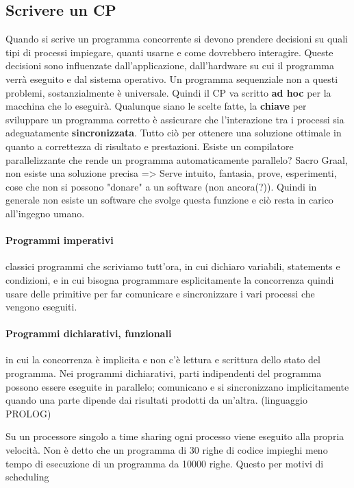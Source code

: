 \documentclass[10pt,a4paper]{article}
\begin{document}
\subsection{Scrivere un CP}
Quando si scrive un programma concorrente si devono prendere decisioni su quali tipi di processi impiegare, quanti usarne e come dovrebbero interagire. Queste decisioni sono influenzate dall'applicazione, dall'hardware su cui il programma verrà eseguito e dal sistema operativo. Un programma sequenziale non a questi problemi, sostanzialmente è universale. Quindi il CP va scritto \textbf{ad hoc} per la macchina che lo eseguirà.
Qualunque siano le scelte fatte, la \textbf{chiave} per sviluppare un programma corretto è assicurare che l'interazione tra i processi sia adeguatamente \textbf{sincronizzata}. Tutto ciò per ottenere una soluzione ottimale in quanto a correttezza di risultato e prestazioni.
Esiste un compilatore parallelizzante che rende un programma automaticamente parallelo? Sacro Graal, non esiste una soluzione precisa => Serve intuito, fantasia, prove, esperimenti, cose che non si possono "donare" a un software (non ancora(?)). Quindi in generale non esiste un software che svolge questa funzione e ciò resta in carico all'ingegno umano.

\paragraph{Programmi imperativi}
classici programmi che scriviamo tutt'ora, in cui dichiaro variabili, statements e condizioni, e in cui bisogna programmare esplicitamente la concorrenza quindi usare delle primitive per far comunicare e sincronizzare i vari processi che vengono eseguiti.

\paragraph{Programmi dichiarativi, funzionali}
in cui la concorrenza è implicita e non c'è lettura e scrittura dello stato del programma. Nei programmi dichiarativi, parti indipendenti del programma possono essere eseguite in parallelo; comunicano e si sincronizzano implicitamente quando una parte dipende dai risultati prodotti da un'altra. (linguaggio PROLOG)

Su un processore singolo a time sharing ogni processo viene eseguito alla propria velocità. Non è detto che un programma di 30 righe di codice impieghi meno tempo di esecuzione di un programma da 10000 righe. Questo per motivi di scheduling
\end{document}
